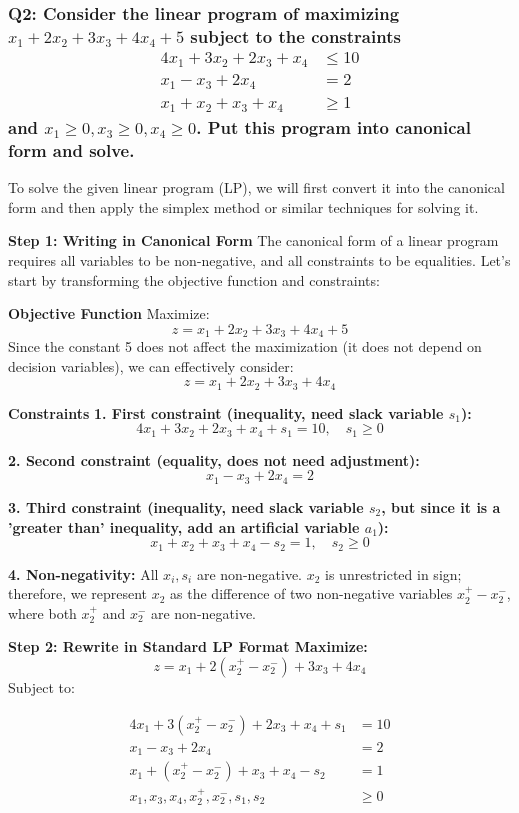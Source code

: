 \documentclass[8pt]{article}
\begin{document}
{\subsubsection*{Q2: Consider the linear program of maximizing \(x_1 + 2x_2 + 3x_3 + 4x_4 + 5\) subject to the constraints
\[
\begin{aligned}
4x_1 + 3x_2 + 2x_3 + x_4 &\leq 10 \\
x_1 - x_3 + 2x_4 &= 2 \\
x_1 + x_2 + x_3 + x_4 &\geq 1
\end{aligned}
\]
and \(x_1 \geq 0, x_3 \geq 0, x_4 \geq 0\). Put this program into canonical form and solve.}

To solve the given linear program (LP), we will first convert it into the canonical form and then apply the simplex method or similar techniques for solving it.

\textbf{Step 1: Writing in Canonical Form}
The canonical form of a linear program requires all variables to be non-negative, and all constraints to be equalities. Let's start by transforming the objective function and constraints:

\textbf{Objective Function}
Maximize:
\[
z = x_1 + 2x_2 + 3x_3 + 4x_4 + 5
\]
Since the constant 5 does not affect the maximization (it does not depend on decision variables), we can effectively consider:
\[
z = x_1 + 2x_2 + 3x_3 + 4x_4
\]

\textbf{Constraints}
\textbf{1. First constraint (inequality, need slack variable \(s_1\)):}
   \[
   4x_1 + 3x_2 + 2x_3 + x_4 + s_1 = 10, \quad s_1 \geq 0
   \]

\textbf{2. Second constraint (equality, does not need adjustment):}
   \[
   x_1 - x_3 + 2x_4 = 2
   \]

\textbf{3. Third constraint (inequality, need slack variable \(s_2\), but since it is a 'greater than' inequality, add an artificial variable \(a_1\)):}
   \[
   x_1 + x_2 + x_3 + x_4 - s_2 = 1, \quad s_2 \geq 0
   \]

\textbf{4. Non-negativity:}
   All \(x_i, s_i\) are non-negative. \(x_2\) is unrestricted in sign; therefore, we represent \(x_2\) as the difference of two non-negative variables \(x_2^+ - x_2^- \), where both \(x_2^+\) and \(x_2^-\) are non-negative.

\textbf{Step 2: Rewrite in Standard LP Format
Maximize:}
\[
z = x_1 + 2(x_2^+ - x_2^-) + 3x_3 + 4x_4
\]
Subject to:

\begin{align*}
4x_1 + 3(x_2^+ - x_2^-) + 2x_3 + x_4 + s_1 &= 10 \\
x_1 - x_3 + 2x_4 &= 2 \\
x_1 + (x_2^+ - x_2^-) + x_3 + x_4 - s_2 &= 1 \\
x_1, x_3, x_4, x_2^+, x_2^-, s_1, s_2 &\geq 0
\end{align*}


}
\end{document}
